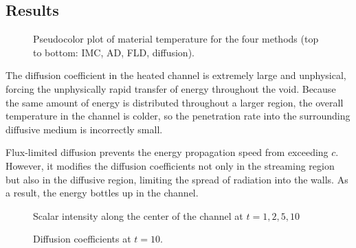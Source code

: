 \documentclass[11pt,letter,twoside]{mc2011}
\begin{document}
\subsection{Results}

\begin{figure}[htb]
  \centering
  \hspace{-1.25in}
  \hspace{-1.25in}
  \caption{Pseudocolor plot of material temperature for the four methods (top
  to bottom: IMC, AD, FLD, diffusion).}
  \label{fig:mattemp2d}
\end{figure}

The diffusion coefficient in the heated channel is extremely large and
unphysical, forcing the unphysically rapid transfer of energy throughout the
void. Because the same amount of energy is distributed throughout a larger
region, the overall temperature in the channel is colder, so the penetration
rate into the surrounding diffusive medium is incorrectly small.

Flux-limited diffusion prevents the energy propagation speed from exceeding $c$.
However, it modifies the diffusion coefficients not only in the streaming
region but also in the diffusive region, limiting the spread of radiation into
the walls. As a result, the energy bottles up in the channel.

\begin{figure}[htb]
  \centering
  \hspace{-1.25in}
  \subfigure[$t=1.0$]{
  \small}
  \hspace{-.4in}
  \subfigure[$t=2.0$]{
  \small}
  \hspace{-1.25in}

  \hspace{-1.25in}
  \subfigure[$t=5.0$]{
  \small}
  \hspace{-.4in}
  \subfigure[$t=10.0$]{
  \small}
  \hspace{-1.25in}
  \caption{Scalar intensity along the center of the channel at $t=1,2,5,10$}
  \label{fig:phi}
\end{figure}

\begin{figure}[htb]
  \centering
  \hspace{-1.25in}
  \hspace{-1.25in}
  \caption{Diffusion coefficients at $t=10$.}
  \label{fig:dcoeffT10}
\end{figure}
\end{document}
